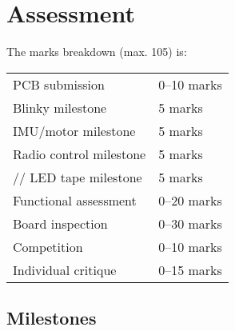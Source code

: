 \documentclass[11pt, a4paper]{article}
\begin{document}
\section{Assessment}

The marks breakdown (max. 105) is:
%
\begin{flushleft}
  \begin{tabular}{ll}
    PCB submission & 0--10 marks\\
    Blinky milestone  & 5 marks\\    
    IMU/motor milestone  & 5 marks\\
    Radio control milestone  & 5 marks\\
//    LED tape milestone  & 5 marks\\    
    Functional assessment & 0--20 marks \\
    Board inspection & 0--30 marks \\
    Competition & 0--10 marks \\
    Individual critique & 0--15 marks \\
  \end{tabular}
  
\end{flushleft}

\subsection{Milestones}
\end{document}
